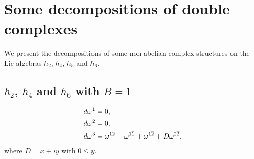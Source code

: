 \documentclass[leqno]{article}
\theoremstyle{definition}
\numberwithin{equation}{section}
\begin{document}
\section{Some decompositions of double complexes}
We present the decompositions of some non-abelian complex structures on the Lie algebras $h_2$, $h_4$, $h_5$ and $h_6$.

\subsection{$h_2$, $h_4$ and $h_6$ with $B=1$}
\[
\aligned
d \omega^1 &= 0, \\
d \omega^2 &= 0, \\
d \omega^3 &= \omega^{12} + \omega^{1 \overline{1}} + 
\omega^{1 \overline{2}} + D \omega^{2 \overline{2}},
\endaligned
\]
where $D = x + iy$ with $0 \leqslant y$.
\end{document}
